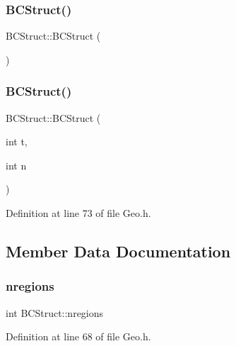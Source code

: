 \subsubsection{\texorpdfstring{B\+C\+Struct()}{BCStruct()}\hspace{0.1cm}{\footnotesize\ttfamily [1/2]}}
{\footnotesize\ttfamily B\+C\+Struct\+::\+B\+C\+Struct (\begin{DoxyParamCaption}{ }\end{DoxyParamCaption})}

\mbox{\label{structBCStruct_a386d4109f10a0afcfde6a2eb5cc042f2}} 
\subsubsection{\texorpdfstring{B\+C\+Struct()}{BCStruct()}\hspace{0.1cm}{\footnotesize\ttfamily [2/2]}}
{\footnotesize\ttfamily B\+C\+Struct\+::\+B\+C\+Struct (\begin{DoxyParamCaption}\item[{int}]{t,  }\item[{int}]{n }\end{DoxyParamCaption})\hspace{0.3cm}{\ttfamily [inline]}}



Definition at line 73 of file Geo.\+h.



\subsection{Member Data Documentation}
\mbox{\label{structBCStruct_a0e4797d0448c5eb3a02ffd8c10661c36}} 
\subsubsection{\texorpdfstring{nregions}{nregions}}
{\footnotesize\ttfamily int B\+C\+Struct\+::nregions}



Definition at line 68 of file Geo.\+h.

\mbox{\label{structBCStruct_a36709c2ded1119ce84dad8aa5f64d877}} 
